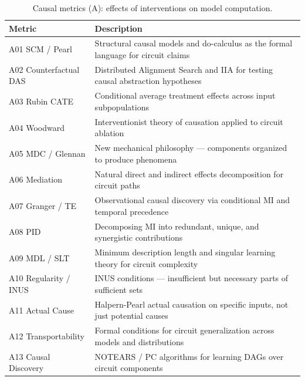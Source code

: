 \documentclass[10pt]{article}
\begin{document}
\begin{table}[H]
\centering
\small
\caption{Causal metrics (A): effects of interventions on model computation.}
\renewcommand{\arraystretch}{1.12}
\begin{tabular}{@{}lp{10cm}@{}}
\toprule
\textbf{Metric} & \textbf{Description} \\
\midrule
A01 SCM / Pearl & Structural causal models and do-calculus as the formal language for circuit claims \\
A02 Counterfactual DAS & Distributed Alignment Search and IIA for testing causal abstraction hypotheses \\
A03 Rubin CATE & Conditional average treatment effects across input subpopulations \\
A04 Woodward & Interventionist theory of causation applied to circuit ablation \\
A05 MDC / Glennan & New mechanical philosophy --- components organized to produce phenomena \\
A06 Mediation & Natural direct and indirect effects decomposition for circuit paths \\
A07 Granger / TE & Observational causal discovery via conditional MI and temporal precedence \\
A08 PID & Decomposing MI into redundant, unique, and synergistic contributions \\
A09 MDL / SLT & Minimum description length and singular learning theory for circuit complexity \\
A10 Regularity / INUS & INUS conditions --- insufficient but necessary parts of sufficient sets \\
A11 Actual Cause & Halpern-Pearl actual causation on specific inputs, not just potential causes \\
A12 Transportability & Formal conditions for circuit generalization across models and distributions \\
A13 Causal Discovery & NOTEARS / PC algorithms for learning DAGs over circuit components \\
\bottomrule
\end{tabular}
\end{table}
\end{document}
